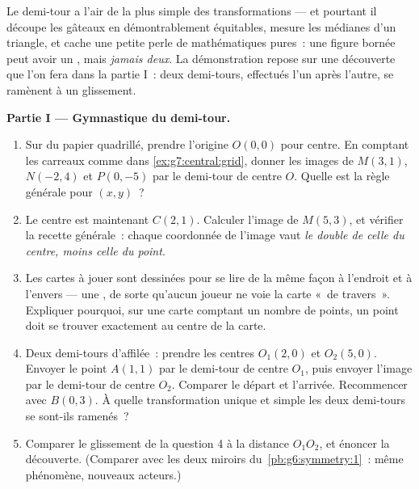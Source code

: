 \begin{problem}
\label{pb:g7:central:1}
Le demi-tour a l'air de la plus simple des transformations --- et
pourtant il découpe les gâteaux en  démontrablement
équitables, mesure les médianes d'un triangle, et cache une petite
perle de mathématiques pures~: une figure bornée peut avoir un , mais \emph{jamais deux}. La démonstration repose sur une
découverte que l'on fera dans la partie I~: deux demi-tours,
effectués l'un après l'autre, se ramènent à un glissement.

\medskip
\noindent\textbf{Partie I --- Gymnastique du demi-tour.}
\begin{enumerate}
  \item Sur du papier quadrillé, prendre l'origine $O(0, 0)$ pour
        centre. En comptant les carreaux comme dans
        \cref{ex:g7:central:grid}, donner les images de $M(3, 1)$,
        $N(-2, 4)$ et $P(0, -5)$ par le demi-tour de centre $O$.
        Quelle est la règle générale pour $(x, y)$~?
  \item Le centre est maintenant $C(2, 1)$. Calculer l'image de
        $M(5, 3)$, et vérifier la recette générale~: chaque
        coordonnée de l'image vaut \emph{le double de celle du
        centre, moins celle du point}.
  \item Les cartes à jouer sont dessinées pour se lire de la même
        façon à l'endroit et à l'envers --- une ,
        de sorte qu'aucun joueur ne voie la carte «~de travers~».
        Expliquer pourquoi, sur une carte comptant un nombre
        \emph{} de points, un point doit se trouver exactement
        au centre de la carte.
  \item Deux demi-tours d'affilée~: prendre les centres $O_1(2, 0)$
        et $O_2(5, 0)$. Envoyer le point $A(1, 1)$ par le demi-tour
        de centre $O_1$, puis envoyer l'image par le demi-tour de
        centre $O_2$. Comparer le départ et l'arrivée. Recommencer
        avec $B(0, 3)$. À quelle transformation unique et simple les
        deux demi-tours se sont-ils ramenés~?
  \item Comparer le glissement de la question 4 à la distance
        $O_1 O_2$, et énoncer la découverte. (Comparer avec les deux
        miroirs  du~\cref{pb:g6:symmetry:1}~: même
        phénomène, nouveaux acteurs.)
\end{enumerate}


\end{problem}
